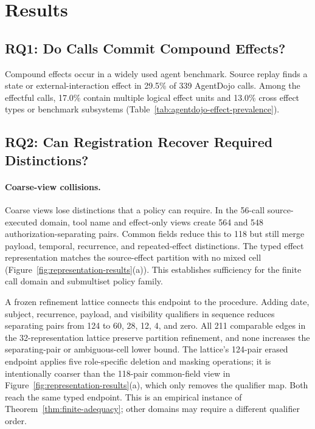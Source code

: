 \section{Results}
\label{sec:results}

\subsection{RQ1: Do Calls Commit Compound Effects?}



Compound effects occur in a widely used agent benchmark.  Source replay finds
a state or external-interaction effect in 29.5\% of 339 AgentDojo calls.  Among
the effectful calls, 17.0\% contain multiple logical effect units and 13.0\%
cross effect types or benchmark subsystems
(Table~\ref{tab:agentdojo-effect-prevalence}).

\subsection{RQ2: Can Registration Recover Required Distinctions?}



\paragraph{Coarse-view collisions.}
Coarse views lose distinctions that a policy can require.  In the 56-call
source-executed domain, tool name and effect-only views create 564 and 548
authorization-separating pairs.  Common fields reduce this to 118 but still
merge payload, temporal, recurrence, and repeated-effect distinctions.  The
typed effect representation matches the source-effect partition with no mixed
cell (Figure~\ref{fig:representation-results}(a)).  This establishes sufficiency
for the finite call domain and submultiset policy family.

A frozen refinement lattice connects this endpoint to the procedure.  Adding
date, subject, recurrence, payload, and visibility qualifiers in sequence
reduces separating pairs from 124 to 60, 28, 12, 4, and zero.  All 211
comparable edges in the 32-representation lattice preserve partition
refinement, and none increases the separating-pair or ambiguous-cell lower
bound.  The lattice's 124-pair erased endpoint applies five role-specific
deletion and masking operations; it is intentionally coarser than the
118-pair common-field view in Figure~\ref{fig:representation-results}(a), which
only removes the qualifier map.  Both reach the same typed endpoint.  This is
an empirical instance of Theorem~\ref{thm:finite-adequacy}; other domains may
require a different qualifier order.

